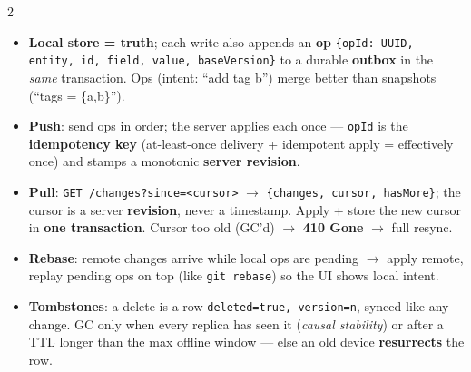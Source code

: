 \documentclass[8pt]{extarticle}
\newcommand\ct[1]{\texttt{#1}}
\newcommand\hd[1]{\par\vspace{3pt}\noindent{\bfseries\color{sheetBlue}#1}\par\vspace{1pt}}
\begin{document}

\begin{multicols}{2}
\raggedright\footnotesize{}

\hd{The engine}
\begin{itemize}
  \item \textbf{Local store = truth}; each write also appends an \textbf{op}
        \ct{\{opId: UUID, entity, id, field, value, baseVersion\}} to a durable \textbf{outbox}
        in the \emph{same} transaction. Ops (intent: ``add tag b'') merge better than
        snapshots (``tags = \{a,b\}'').
  \item \textbf{Push}: send ops in order; the server applies each once — \ct{opId} is the
        \textbf{idempotency key} (at-least-once delivery + idempotent apply = effectively once)
        and stamps a monotonic \textbf{server revision}.
  \item \textbf{Pull}: \ct{GET /changes?since=<cursor>} $\to$ \ct{\{changes, cursor, hasMore\}};
        the cursor is a server \textbf{revision}, never a timestamp. Apply + store the new
        cursor in \textbf{one transaction}. Cursor too old (GC'd) $\to$ \textbf{410 Gone} $\to$
        full resync.
  \item \textbf{Rebase}: remote changes arrive while local ops are pending $\to$ apply remote,
        replay pending ops on top (like \ct{git rebase}) so the UI shows local intent.
  \item \textbf{Tombstones}: a delete is a row \ct{deleted=true, version=n}, synced like any
        change. GC only when every replica has seen it (\emph{causal stability}) or after a TTL
        longer than the max offline window — else an old device \textbf{resurrects} the row.
\end{itemize}


\end{multicols}
\end{document}
